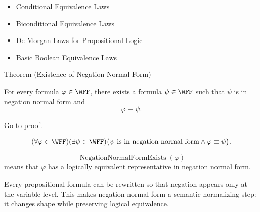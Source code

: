 \begin{dependencies}
\begin{itemize}
  \item \hyperref[thm:conditional-equivalence-laws-propositional-logic]{Conditional Equivalence Laws}
  \item \hyperref[thm:biconditional-equivalence-laws-propositional-logic]{Biconditional Equivalence Laws}
  \item \hyperref[thm:de-morgan-laws-propositional-logic]{De Morgan Laws for Propositional Logic}
  \item \hyperref[thm:basic-boolean-equivalence-laws-propositional-logic]{Basic Boolean Equivalence Laws}
\end{itemize}
\end{dependencies}

\begin{theorembox}{Theorem (Existence of Negation Normal Form)}
\begin{theorem}
\label{thm:existence-negation-normal-form-propositional-logic}
For every formula \(\varphi\in\WFF\), there exists a formula \(\psi\in\WFF\)
such that \(\psi\) is in negation normal form and
\[
\varphi\equiv\psi.
\]

\noindent\hyperref[prf:existence-negation-normal-form-propositional-logic]{Go to proof.}
\end{theorem}
\end{theorembox}

\begin{remark*}
\[
(\forall\varphi\in\WFF)(\exists\psi\in\WFF)
\bigl(\psi\text{ is in negation normal form}\land \varphi\equiv\psi\bigr).
\]
\end{remark*}

\begin{remark*}
\[
\operatorname{NegationNormalFormExists}(\varphi)
\]
means that \(\varphi\) has a logically equivalent representative in negation
normal form.
\end{remark*}

\begin{remark*}[Interpretation]
Every propositional formula can be rewritten so that negation appears only at
the variable level. This makes negation normal form a semantic normalizing step:
it changes shape while preserving logical equivalence.
\end{remark*}

